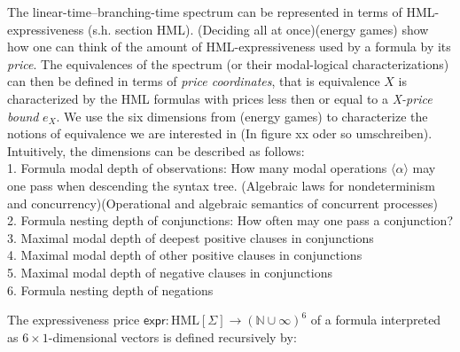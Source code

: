 %
\begin{isabellebody}%
%
%
\isadelimtheory
%
\endisadelimtheory
%
\isatagtheory
%
\endisatagtheory
{\isafoldtheory}%
%
\isadelimtheory
%
\endisadelimtheory
%
\isadelimdocument
%
\endisadelimdocument
%
\isatagdocument
%
\isamarkuptrue%
%
\endisatagdocument
{\isafolddocument}%
%
\isadelimdocument
%
\endisadelimdocument
%
\begin{isamarkuptext}%
The linear-time--branching-time spectrum can be represented in terms of HML-expressiveness (s.h. section HML).
(Deciding all at once)(energy games) show how one can think of the amount of HML-expressiveness used by a formula by its \textit{price}.
The equivalences of the spectrum (or their modal-logical characterizations) can then be defined in terms of \textit{price coordinates}, that is
equivalence $X$ is characterized by the HML formulas with prices less then or equal to a \textit{X-price bound} $e_X$.
We use the six dimensions from (energy games) to characterize the notions of equivalence we are interested in (In figure xx oder so umschreiben).
Intuitively, the dimensions can be described as follows:\\
1. Formula modal depth of observations: How many modal operations $\langle \alpha \rangle$ may one pass when descending the syntax tree. (Algebraic laws for nondeterminism and concurrency)(Operational and algebraic semantics of concurrent processes)\\
2. Formula nesting depth of conjunctions: How often may one pass a conjunction?\\
3. Maximal modal depth of deepest positive clauses in conjunctions\\
4. Maximal modal depth of other positive clauses in conjunctions\\
5. Maximal modal depth of negative clauses in conjunctions\\
6. Formula nesting depth of negations\\%
\end{isamarkuptext}\isamarkuptrue%
%
\isadelimdocument
%
\endisadelimdocument
%
\isatagdocument
%
\isamarkuptrue%
%
\endisatagdocument
{\isafolddocument}%
%
\isadelimdocument
%
\endisadelimdocument
%
\begin{isamarkuptext}%
The expressiveness price $\textsf{expr} : \text{HML}[\Sigma] \rightarrow (\mathbb{N \cup \infty})^6$ of a formula interpreted as $6 \times 1$-dimensional vectors is defined recursively by:


\end{isamarkuptext}
\end{isabellebody}
